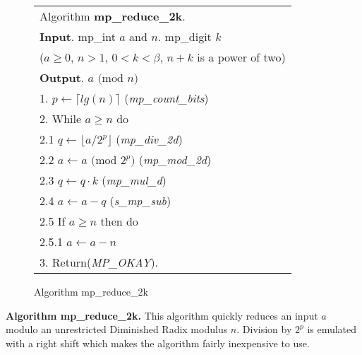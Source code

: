 \documentclass[b5paper]{book}
\begin{document}
\begin{figure}[!here]
\begin{small}
\begin{center}
\begin{tabular}{l}
\hline Algorithm \textbf{mp\_reduce\_2k}. \\
\textbf{Input}.   mp\_int $a$ and $n$.  mp\_digit $k$  \\
\hspace{11.5mm}($a \ge 0$, $n > 1$, $0 < k < \beta$, $n + k$ is a power of two) \\
\textbf{Output}.  $a \mbox{ (mod }n\mbox{)}$ \\
\hline
1.  $p \leftarrow \lceil lg(n) \rceil$  (\textit{mp\_count\_bits}) \\
2.  While $a \ge n$ do \\
\hspace{3mm}2.1  $q \leftarrow \lfloor a / 2^p \rfloor$ (\textit{mp\_div\_2d}) \\
\hspace{3mm}2.2  $a \leftarrow a \mbox{ (mod }2^p\mbox{)}$ (\textit{mp\_mod\_2d}) \\
\hspace{3mm}2.3  $q \leftarrow q \cdot k$ (\textit{mp\_mul\_d}) \\
\hspace{3mm}2.4  $a \leftarrow a - q$ (\textit{s\_mp\_sub}) \\
\hspace{3mm}2.5  If $a \ge n$ then do \\
\hspace{6mm}2.5.1  $a \leftarrow a - n$ \\
3.  Return(\textit{MP\_OKAY}). \\
\hline
\end{tabular}
\end{center}
\end{small}
\caption{Algorithm mp\_reduce\_2k}
\end{figure}

\textbf{Algorithm mp\_reduce\_2k.}
This algorithm quickly reduces an input $a$ modulo an unrestricted Diminished Radix modulus $n$.  Division by $2^p$ is emulated with a right
shift which makes the algorithm fairly inexpensive to use.  
\end{document}
